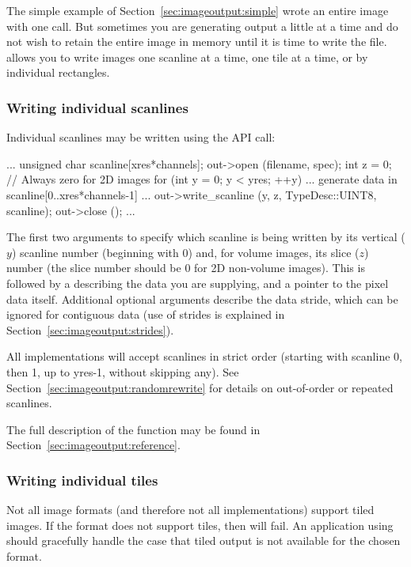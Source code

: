 The simple example of Section~\ref{sec:imageoutput:simple} wrote an
entire image with one call.  But sometimes you are generating output a
little at a time and do not wish to retain the entire image in memory
until it is time to write the file.  \product allows you to write images
one scanline at a time, one tile at a time, or by individual rectangles.

\subsubsection{Writing individual scanlines}

Individual scanlines may be written using the \writescanline API
call:

\begin{code}
        ...
        unsigned char scanline[xres*channels];
        out->open (filename, spec);
        int z = 0;   // Always zero for 2D images
        for (int y = 0;  y < yres;  ++y) {
            ... generate data in scanline[0..xres*channels-1] ...
            out->write_scanline (y, z, TypeDesc::UINT8, scanline);
        }
        out->close ();
        ...
\end{code}

The first two arguments to \writescanline specify which scanline is
being written by its vertical ($y$) scanline number (beginning with 0)
and, for volume images, its slice ($z$) number (the slice number should
be 0 for 2D non-volume images).  This is followed by a \TypeDesc
describing the data you are supplying, and a pointer to the pixel data
itself.  Additional optional arguments describe the data stride, which
can be ignored for contiguous data (use of strides is explained in
Section~\ref{sec:imageoutput:strides}).

All \ImageOutput implementations will accept scanlines in strict order
(starting with scanline 0, then 1, up to {\kw yres-1}, without skipping
any).  See Section~\ref{sec:imageoutput:randomrewrite} for details
on out-of-order or repeated scanlines.

The full description of the \writescanline function may be found
in Section~\ref{sec:imageoutput:reference}.

\subsubsection{Writing individual tiles}

Not all image formats (and therefore not all \ImageOutput
implementations) support tiled images.  If the format does not support
tiles, then \writetile will fail.  An application using \product
should gracefully handle the case that tiled output is not available for
the chosen format.

